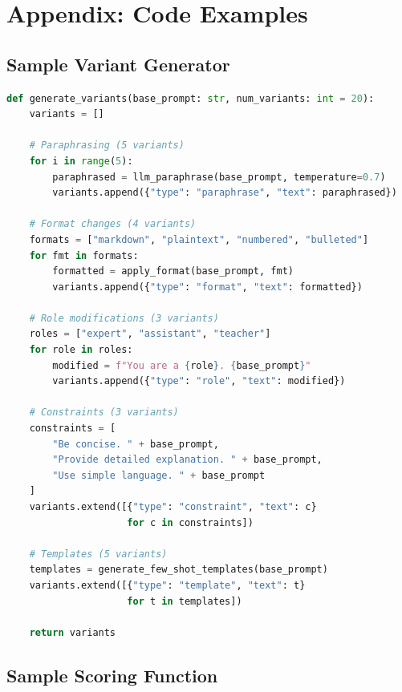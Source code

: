 \documentclass[11pt,a4paper]{article}
\begin{document}
\section{Appendix: Code Examples}

\subsection{Sample Variant Generator}

\begin{lstlisting}[language=Python, caption=Variant generator pseudocode]
def generate_variants(base_prompt: str, num_variants: int = 20):
    variants = []
    
    # Paraphrasing (5 variants)
    for i in range(5):
        paraphrased = llm_paraphrase(base_prompt, temperature=0.7)
        variants.append({"type": "paraphrase", "text": paraphrased})
    
    # Format changes (4 variants)
    formats = ["markdown", "plaintext", "numbered", "bulleted"]
    for fmt in formats:
        formatted = apply_format(base_prompt, fmt)
        variants.append({"type": "format", "text": formatted})
    
    # Role modifications (3 variants)
    roles = ["expert", "assistant", "teacher"]
    for role in roles:
        modified = f"You are a {role}. {base_prompt}"
        variants.append({"type": "role", "text": modified})
    
    # Constraints (3 variants)
    constraints = [
        "Be concise. " + base_prompt,
        "Provide detailed explanation. " + base_prompt,
        "Use simple language. " + base_prompt
    ]
    variants.extend([{"type": "constraint", "text": c} 
                     for c in constraints])
    
    # Templates (5 variants)
    templates = generate_few_shot_templates(base_prompt)
    variants.extend([{"type": "template", "text": t} 
                     for t in templates])
    
    return variants
\end{lstlisting}

\subsection{Sample Scoring Function}
\end{document}
